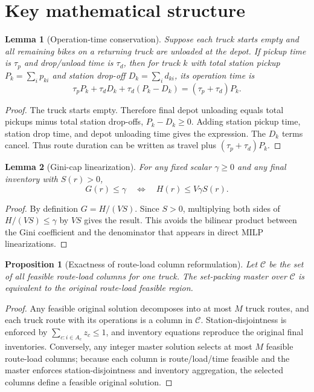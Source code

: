 \documentclass[11pt]{article}
\newtheorem{lemma}{Lemma}
\newtheorem{proposition}{Proposition}
\begin{document}
\section{Key mathematical structure}

\begin{lemma}[Operation-time conservation]
Suppose each truck starts empty and all remaining bikes on a returning truck are unloaded at the depot. If pickup time is $\tau_p$ and drop/unload time is $\tau_d$, then for truck $k$ with total station pickup $P_k=\sum_i p_{ki}$ and station drop-off $D_k=\sum_i d_{ki}$, its operation time is
\[
\tau_p P_k+\tau_d D_k+\tau_d(P_k-D_k)=(\tau_p+\tau_d)P_k.
\]
\end{lemma}
\begin{proof}
The truck starts empty. Therefore final depot unloading equals total pickups minus total station drop-offs, $P_k-D_k\ge 0$. Adding station pickup time, station drop time, and depot unloading time gives the expression. The $D_k$ terms cancel. Thus route duration can be written as travel plus $(\tau_p+\tau_d)P_k$.
\end{proof}

\begin{lemma}[Gini-cap linearization]
For any fixed scalar $\gamma\ge 0$ and any final inventory with $S(r)>0$,
\[
G(r)\le \gamma \quad\Longleftrightarrow\quad H(r)\le V\gamma S(r).
\]
\end{lemma}
\begin{proof}
By definition $G=H/(VS)$. Since $S>0$, multiplying both sides of $H/(VS)\le \gamma$ by $VS$ gives the result. This avoids the bilinear product between the Gini coefficient and the denominator that appears in direct MILP linearizations.
\end{proof}

\begin{proposition}[Exactness of route-load column reformulation]
Let $\mathcal{C}$ be the set of all feasible route-load columns for one truck. The set-packing master over $\mathcal{C}$ is equivalent to the original route-load feasible region.
\end{proposition}
\begin{proof}
Any feasible original solution decomposes into at most $M$ truck routes, and each truck route with its operations is a column in $\mathcal{C}$. Station-disjointness is enforced by $\sum_{c:i\in A_c}z_c\le 1$, and inventory equations reproduce the original final inventories. Conversely, any integer master solution selects at most $M$ feasible route-load columns; because each column is route/load/time feasible and the master enforces station-disjointness and inventory aggregation, the selected columns define a feasible original solution.
\end{proof}
\end{document}
